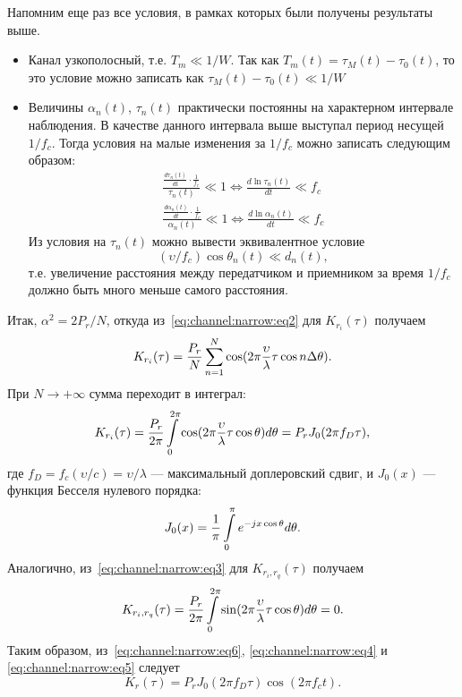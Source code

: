 \documentclass{book}
\numberwithin{theorem}{chapter}
\numberwithin{statement}{chapter}
\numberwithin{lemma}{chapter}
\theoremstyle{definition}
\numberwithin{task}{chapter}
\theoremstyle{remark}
\numberwithin{example}{chapter}
\theoremstyle{definition}
\numberwithin{definition}{chapter}
\theoremstyle{remark}
\theoremstyle{remark}
\numberwithin{lyrics}{section}
\begin{document}
Напомним еще раз все условия, в рамках которых были получены результаты выше.
\begin{itemize}
	\item Канал узкополосный, т.е. $T_m \ll 1 / W$. Так как $T_m(t) = \tau_M(t) - \tau_0(t)$, то это условие можно записать как $\tau_{M}(t) - \tau_0(t) \ll 1 / W$
	\item Величины $\alpha_n(t)$, $\tau_n(t)$ практически постоянны на характерном интервале наблюдения. В качестве данного интервала выше выступал период несущей $1 / f_c$. Тогда условия на малые изменения за $ 1/ f_c$ можно записать следующим образом:
	\begin{gather*}
	\frac{\frac{d \tau_n(t)}{d t} \cdot \frac{1}{f_c}}{\tau_n(t)} \ll 1 \Leftrightarrow \frac{d \ln \tau_n(t)}{dt} \ll f_c \\
	\frac{\frac{d \alpha_n(t)}{d t} \cdot \frac{1}{f_c}}{\alpha_n(t)} \ll 1 \Leftrightarrow \frac{d \ln \alpha_n(t)}{dt} \ll f_c 
	\end{gather*}
	Из условия на $\tau_n(t)$ можно вывести эквивалентное условие
	$$
	(\upsilon / f_c) \cos \theta_n(t) \ll d_n(t),
	$$
	т.е. увеличение расстояния между передатчиком и приемником за время $1/f_c$ должно быть много меньше самого расстояния.
\end{itemize}

Итак, $\alpha^2 = 2P_r / N$, откуда из~\eqref{eq:channel:narrow:eq2} для $K_{r_i}(\tau)$ получаем
\begin{equation*}
K_{r_i}(\tau) = \frac{P_r}{N} \sum\limits_{n = 1}^N \cos (2\pi \frac{\upsilon}{\lambda} \tau \cos n \Delta \theta).
\end{equation*}
При $N \rightarrow +\infty$ сумма переходит в интеграл:
\begin{equation}
\label{eq:channel:narrow:eq4}
K_{r_i}(\tau) = \frac{P_r}{2 \pi} \int\limits_{0}^{2\pi} \cos (2\pi \frac{\upsilon}{\lambda} \tau \cos \theta) d\theta = P_r J_0(2\pi f_D \tau),
\end{equation}
где $f_D = f_c (\upsilon / c) = \upsilon / \lambda$ --- максимальный доплеровский сдвиг, и $J_0(x)$ --- функция Бесселя нулевого порядка:
\begin{equation*}
J_0(x) = \frac{1}{\pi} \int\limits_{0}^{\pi} e^{-jx\cos\theta} d\theta.
\end{equation*}
Аналогично, из~\eqref{eq:channel:narrow:eq3} для $K_{r_i, r_q}(\tau)$ получаем
\begin{equation}
\label{eq:channel:narrow:eq5}
K_{r_i, r_q}(\tau) = \frac{P_r}{2\pi} \int\limits_0^{2\pi} \sin (2\pi \frac{\upsilon}{\lambda} \tau \cos \theta) d\theta = 0.
\end{equation}
Таким образом, из~\eqref{eq:channel:narrow:eq6}, \eqref{eq:channel:narrow:eq4} и \eqref{eq:channel:narrow:eq5} следует
\begin{equation*}
K_r(\tau) = P_r J_0(2\pi f_D \tau) \cos(2\pi f_c t).
\end{equation*}
\end{document}
